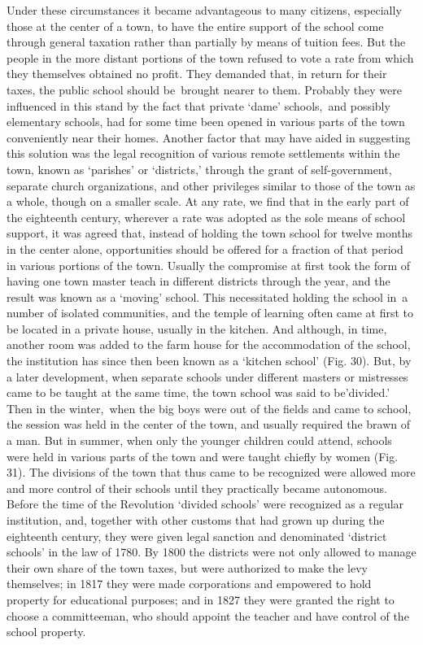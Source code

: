 \documentclass[
]{book}
\begin{document}
Under these circumstances it became advantageous to many citizens, especially those at the center of a town, to have the entire support of the school come through general taxation rather than partially by means of tuition fees. But the people in the more distant portions of the town refused to vote a rate from which they themselves obtained no profit. They demanded that, in return for their taxes, the public school should be~brought nearer to them. Probably they were influenced in this stand by the fact that private `dame' schools,~and possibly elementary schools, had for some time been opened in various parts of the town conveniently near their homes. Another factor that may have aided in suggesting this solution was the legal recognition of various remote settlements within the town, known as `parishes' or `districts,' through the grant of self-government, separate church organizations, and other privileges similar to those of the town as a whole, though on a smaller scale. At any rate, we find that in the early part of the eighteenth century, wherever a rate was adopted as the sole means of school support, it was agreed that, instead of holding the town school for twelve months in the center alone, opportunities should be offered for a fraction of that period in various portions of the town. Usually the compromise at first took the form of having one town master teach in different districts through the year, and the result was known as a `moving' school. This necessitated holding the school in~a number of isolated communities, and the temple of learning often came at first to be located in a private house, usually in the kitchen. And although, in time, another room was added to the farm house for the accommodation of the school, the institution has since then been known as a `kitchen school' (Fig. 30). But, by a later development, when separate schools under different masters or mistresses came to be taught at the same time, the town school was said to be'divided.' Then in the winter,~when the big boys were out of the fields and came to school, the session was held in the center of the town, and usually required the brawn of a man. But in summer, when only the younger children could attend, schools were held in various parts of the town and were taught chiefly by women (Fig. 31). The divisions of the town that thus came to be recognized were allowed more and more control of their schools until they practically became autonomous. Before the time of the Revolution `divided schools' were recognized as a regular institution, and, together with other customs that had grown up during the eighteenth century, they were given legal sanction and denominated `district schools' in the law of 1780. By 1800 the districts were not only allowed to manage their own share of the town taxes, but were authorized to make the levy themselves; in 1817 they were made corporations and empowered to hold property for educational purposes; and in 1827 they were granted the right to choose a committeeman, who should appoint the teacher and have control of the school property.
\end{document}
